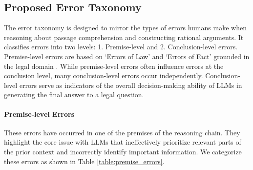 \subsection{Proposed Error Taxonomy}
\label{section:error_taxonomy}
The error taxonomy is designed to mirror the types of errors humans make when reasoning about passage comprehension and constructing rational arguments. It classifies errors into two levels: 1. Premise-level and 2. Conclusion-level errors. Premise-level errors are based on `Errors of Law' and `Errors of Fact' grounded in the legal domain \citep{cornell2024mistake, cornell2024mistake_fact, oreilly2012errors, wilberg2023mistake}. While premise-level errors often influence errors at the conclusion level, many conclusion-level errors occur independently. Conclusion-level errors serve as indicators of the  overall decision-making ability of LLMs in generating the final answer to a legal question. 

\paragraph{Premise-level Errors}
These errors have occurred in one of the premises of the reasoning chain. They highlight the core issue with LLMs that ineffectively prioritize relevant parts of the prior context and incorrectly identify important information. We categorize these errors as shown in Table \ref{table:premise_errors}.
 


